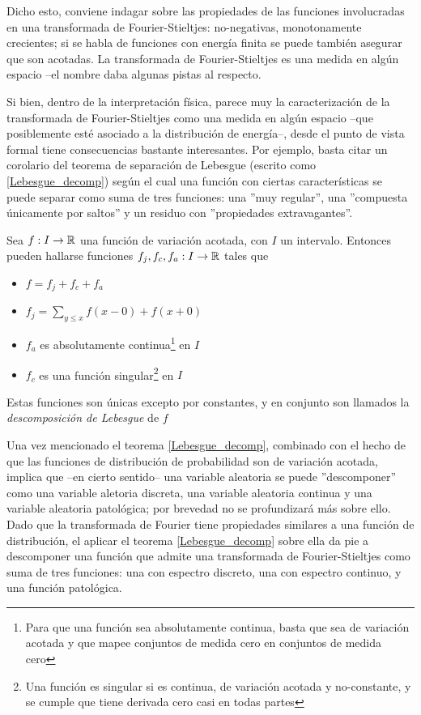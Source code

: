 
Dicho esto, conviene indagar sobre las propiedades de las
funciones involucradas en una
transformada de Fourier-Stieltjes: no-negativas, monotonamente crecientes; si se habla de funciones
con energ\'ia finita se puede tambi\'en asegurar que son acotadas.
La transformada de Fourier-Stieltjes es una medida en alg\'un espacio --el nombre daba
algunas pistas al respecto. 

Si bien, dentro de la interpretaci\'on f\'isica, parece muy
la caracterizaci\'on de la transformada de Fourier-Stieltjes como una medida en alg\'un espacio 
--que posiblemente est\'e asociado a la distribuci\'on de energ\'ia--, desde el punto de vista
formal tiene consecuencias bastante interesantes.
Por ejemplo, basta citar un corolario del teorema de separaci\'on de Lebesgue (escrito
como \ref{Lebesgue_decomp}) seg\'un el cual una funci\'on con ciertas caracter\'isticas se puede 
separar como suma de tres funciones: una ''muy regular'', una ''compuesta \'unicamente por 
saltos'' y un residuo con ''propiedades extravagantes''.

\begin{thrm}%
Sea $f:I\rightarrow \mathbb{R}$ una funci\'on de variaci\'on acotada, con $I$ un intervalo. Entonces
pueden hallarse funciones $f_j, f_c, f_a :I\rightarrow \mathbb{R}$ tales que
\begin{itemize}
\item $f = f_j+ f_c+ f_a$
\item $f_j = \sum_{y \leq x} f(x-0) + f(x+0)$
\item $f_a$ es absolutamente continua\footnote{Para que una funci\'on sea absolutamente continua,
basta que sea de variaci\'on acotada y que mapee conjuntos de medida cero en conjuntos de medida
cero} en $I$
\item $f_c$ es una funci\'on singular\footnote{Una funci\'on es singular si es continua, 
de variaci\'on acotada y no-constante, y se cumple que tiene derivada cero casi en todas partes} 
en $I$
\end{itemize}
Estas funciones son \'unicas excepto por constantes, y en conjunto son llamados la 
\textit{descomposici\'on de Lebesgue} de $f$
\label{Lebesgue_decomp}
\end{thrm}

Una vez mencionado el teorema \ref{Lebesgue_decomp}, combinado con el hecho de que las funciones de 
distribuci\'on de probabilidad
son de variaci\'on acotada, implica que --en cierto sentido-- una variable aleatoria se puede
''descomponer'' como una variable aletoria discreta, una variable aleatoria continua y una
variable aleatoria patol\'ogica; por brevedad no se profundizar\'a m\'as sobre ello.
Dado que la transformada de Fourier tiene propiedades similares a una funci\'on de distribuci\'on,
el aplicar el teorema \ref{Lebesgue_decomp} sobre ella da pie a descomponer una funci\'on
que admite una transformada de Fourier-Stieltjes como suma de tres funciones: una
con espectro discreto, una con espectro continuo, y una funci\'on patol\'ogica.

